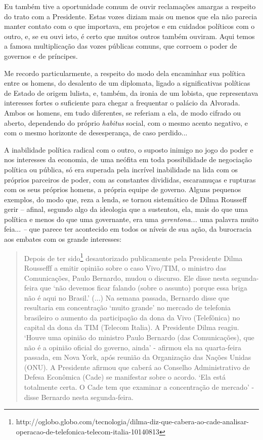 Eu também tive a oportunidade comum de ouvir reclamações amargas a
respeito do trato com a Presidente. Estas vozes diziam mais ou menos que
ela não parecia manter contato com o que importava, em projetos e em
cuidados políticos com o outro, e, se eu ouvi isto, é certo que muitos
outros também ouviram. Aqui temos a famosa multiplicação das vozes
públicas comuns, que corroem o poder de governos e de príncipes.

Me recordo particularmente, a respeito do modo dela encaminhar sua
política entre os homens, do desalento de um diplomata, ligado a
significativas políticas de Estado de origem lulista, e, também, da
ironia de um lobista, que representava interesses fortes o suficiente
para chegar a frequentar o palácio da Alvorada. Ambos os homens, em tudo
diferentes, se referiam a ela, de modo cifrado ou aberto, dependendo do
próprio \emph{habitus} social, com o mesmo acento negativo, e com o
mesmo horizonte de desesperança, de caso perdido...

A inabilidade política radical com o outro, o suposto inimigo no jogo do
poder e nos interesses da economia, de uma neófita em toda possibilidade
de negociação política ou pública, só era superada pela incrível
inabilidade na lida com os próprios parceiros de poder, com as
constantes divididas, escaramuças e rupturas com os seus próprios
homens, a própria equipe de governo. Alguns pequenos exemplos, do modo
que, reza a lenda, se tornou sistemático de Dilma Rousseff gerir --
afinal, segundo algo da ideologia que a sustentou, ela, mais do que uma
política e menos do que uma governante, era uma \emph{gerentona...} uma
palavra muito feia... \emph{--} que parece ter acontecido em todos os
níveis de sua ação, da burocracia aos embates com os grande interesses:

\begin{quote}
Depois de ter
sido\footnote{http://oglobo.globo.com/tecnologia/dilma-diz-que-cabera-ao-cade-analisar-operacao-de-telefonica-telecom-italia-10140813}
desautorizado
publicamente pela Presidente Dilma Roussefff a emitir opinião sobre o
caso Vivo/TIM, o ministro das Comunicações, Paulo Bernardo, mudou o
discurso. Ele disse nesta segunda-feira que `não devemos ficar falando
(sobre o assunto) porque essa briga não é aqui no Brasil.' (...) Na
semana passada, Bernardo disse que resultaria em concentração `muito
grande' no mercado de telefonia brasileiro o aumento da participação da
dona da Vivo (Telefônica) no capital da dona da TIM (Telecom Italia). A
Presidente Dilma reagiu. `Houve uma opinião do ministro Paulo Bernardo
(das Comunicações), que não é a opinião oficial do governo, ainda' -
afirmou ela na quarta-feira passada, em Nova York, após reunião da
Organização das Nações Unidas (ONU). A Presidente afirmou que caberá ao
Conselho Administrativo de Defesa Econômica (Cade) se manifestar sobre o
acordo. `Ela está totalmente certa. O Cade tem que examinar a
concentração de mercado' - disse Bernardo nesta segunda-feira.
\end{quote} 

